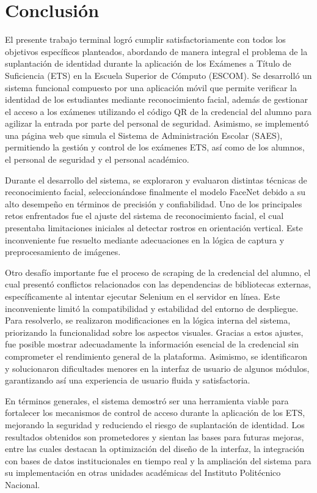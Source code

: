 \section*{Conclusión}
\label{cap:Conclusion}

El presente trabajo terminal logró cumplir satisfactoriamente con todos los objetivos específicos planteados, abordando de manera integral el problema de la suplantación de identidad durante la aplicación de los Exámenes a Título de Suficiencia (ETS) en la Escuela Superior de Cómputo (ESCOM). Se desarrolló un sistema funcional compuesto por una aplicación móvil que permite verificar la identidad de los estudiantes mediante reconocimiento facial, además de gestionar el acceso a los exámenes utilizando el código QR de la credencial del alumno para agilizar la entrada por parte del personal de seguridad. Asimismo, se implementó una página web que simula el Sistema de Administración Escolar (SAES), permitiendo la gestión y control de los exámenes ETS, así como de los alumnos, el personal de seguridad y el personal académico.

Durante el desarrollo del sistema, se exploraron y evaluaron distintas técnicas de reconocimiento facial, seleccionándose finalmente el modelo FaceNet debido a su alto desempeño en términos de precisión y confiabilidad. Uno de los principales retos enfrentados fue el ajuste del sistema de reconocimiento facial, el cual presentaba limitaciones iniciales al detectar rostros en orientación vertical. Este inconveniente fue resuelto mediante adecuaciones en la lógica de captura y preprocesamiento de imágenes.

Otro desafío importante fue el proceso de scraping de la credencial del alumno, el cual presentó conflictos relacionados con las dependencias de bibliotecas externas, específicamente al intentar ejecutar Selenium en el servidor en línea. Este inconveniente limitó la compatibilidad y estabilidad del entorno de despliegue. Para resolverlo, se realizaron modificaciones en la lógica interna del sistema, priorizando la funcionalidad sobre los aspectos visuales. Gracias a estos ajustes, fue posible mostrar adecuadamente la información esencial de la credencial sin comprometer el rendimiento general de la plataforma. Asimismo, se identificaron y solucionaron dificultades menores en la interfaz de usuario de algunos módulos, garantizando así una experiencia de usuario fluida y satisfactoria.

En términos generales, el sistema demostró ser una herramienta viable para fortalecer los mecanismos de control de acceso durante la aplicación de los ETS, mejorando la seguridad y reduciendo el riesgo de suplantación de identidad. Los resultados obtenidos son prometedores y sientan las bases para futuras mejoras, entre las cuales destacan la optimización del diseño de la interfaz, la integración con bases de datos institucionales en tiempo real y la ampliación del sistema para su implementación en otras unidades académicas del Instituto Politécnico Nacional.
